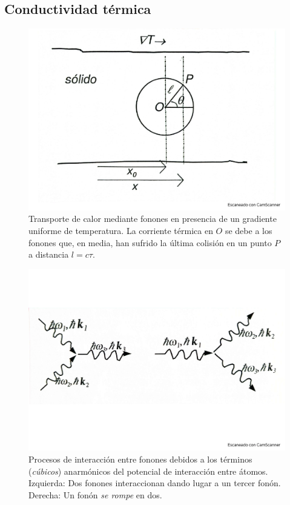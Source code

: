 \subsection{Conductividad térmica}

\begin{figure}[h!] \centering
    \includegraphics[scale=0.5]{Cuerpo/Ch_05/Fotos libro 6.pdf}
    \caption{Transporte de calor mediante fonones en presencia de un gradiente uniforme de temperatura. La corriente térmica en $O$ se debe a los fonones que, en media, han sufrido la última colisión en un punto $P$ a distancia $l=c\tau$.}
    \label{Fig:05-06}
\end{figure}    
\begin{figure}[h!] \centering
    \includegraphics[scale=0.5]{Cuerpo/Ch_05/Fotos libro 7.pdf}
    \caption{Procesos de interacción entre fonones debidos a los términos (\textit{cúbicos}) anarmónicos del potencial de interacción entre átomos. Izquierda: Dos fonones interaccionan dando lugar a un tercer fonón. Derecha: Un fonón \textit{se rompe} en dos.}
    \label{Fig:05-07}
\end{figure}    
